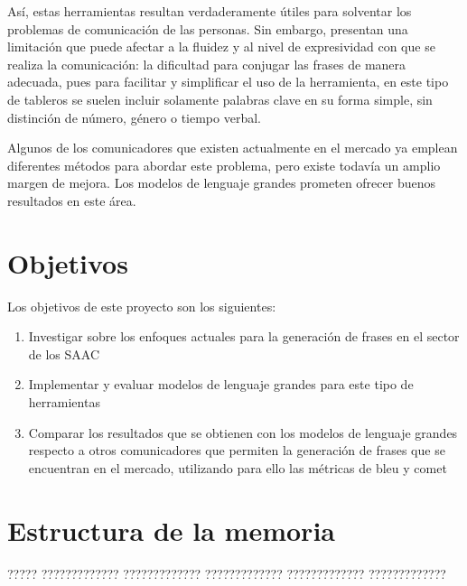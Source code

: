 \documentclass[11pt,spanish,listoffigures,listoftables]{tfgetsinf}
\begin{document}
Así, estas herramientas resultan verdaderamente útiles para solventar los problemas de comunicación de las personas. Sin embargo, presentan una limitación que puede afectar a la fluidez y al nivel de expresividad con que se realiza la comunicación: la dificultad para conjugar las frases de manera adecuada, pues para facilitar y simplificar el uso de la herramienta, en este tipo de tableros se suelen incluir solamente palabras clave en su forma simple, sin distinción de número, género o tiempo verbal.

Algunos de los comunicadores que existen actualmente en el mercado ya emplean diferentes métodos para abordar este problema, pero existe todavía un amplio margen de mejora. Los modelos de lenguaje grandes prometen ofrecer buenos resultados en este área.


\section{Objetivos}

Los objetivos de este proyecto son los siguientes:
\begin{enumerate}
\item Investigar sobre los enfoques actuales para la generación de frases en el sector de los SAAC
\item Implementar y evaluar modelos de lenguaje grandes para este tipo de herramientas
\item Comparar los resultados que se obtienen con los modelos de lenguaje grandes respecto a otros comunicadores que permiten la generación de frases que se encuentran en el mercado, utilizando para ello las métricas de bleu y comet
\end{enumerate}

\section{Estructura de la memoria}

????? ????????????? ????????????? ????????????? ????????????? ????????????? 



\end{document}
